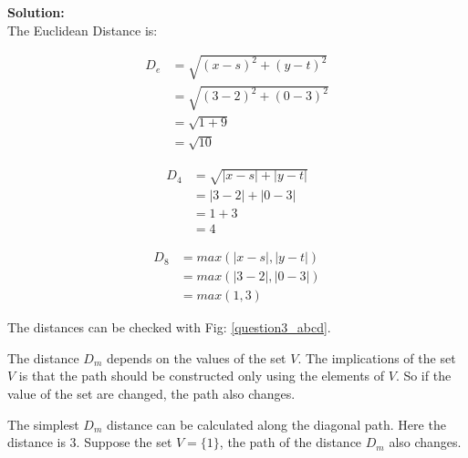 \textbf{Solution:}\\

The Euclidean Distance is:

\begin{equation*}
    \begin{aligned}
    D_e & = \sqrt{( x-s)^{2} +( y-t)^{2}}\\
        & = \sqrt{( 3-2)^{2} +( 0-3)^{2}}\\
        & = \sqrt{1+9}\\
        & = \sqrt{10}
    \end{aligned}
\end{equation*}

\begin{equation*}
    \begin{aligned}
    D_4 & = \sqrt{|x-s| + |y-t|}\\
        & = |3-2| + |0-3|\\
        & = 1 + 3\\
        & = 4
    \end{aligned}
\end{equation*}

\begin{equation*}
    \begin{aligned}
    D_8 & = max(|x-s|, |y-t|)\\
        & = max(|3-2|, |0-3|)\\
        & = max(1,3)
    \end{aligned}
\end{equation*}

The distances can be checked with Fig: \ref{question3_abcd}.

The distance $D_m$ depends on the values of the set $V$. The implications of the set $V$ is that the path should be constructed only using the elements of $V$. So if the value of the set are changed, the path also changes.

The simplest $D_m$ distance can be calculated along the diagonal path. Here the distance is 3. Suppose the set $V = \{1\}$, the path of the distance $D_m$ also changes.


